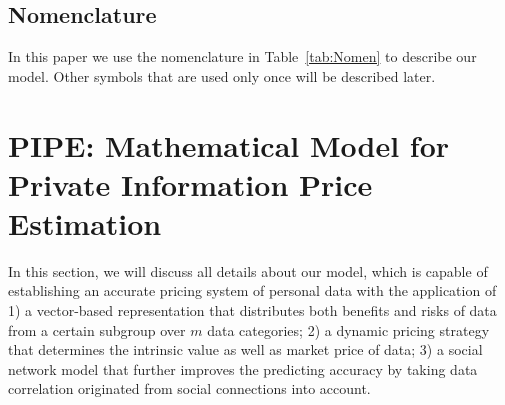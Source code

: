 \documentclass{mcmthesis}
\begin{document}
\subsection{Nomenclature}
\label{sec:nomen}

In this paper we use the nomenclature in Table~\ref{tab:Nomen} to describe our model. Other symbols that are used only once will be described later.


\section{PIPE: Mathematical Model for Private Information Price Estimation}
\label{sec:model}
In this section, we will discuss all details about our model, which is capable of establishing an accurate pricing system of personal data with the application of 1) a vector-based representation that distributes both benefits and risks of data from a certain subgroup over $m$ data categories; 2) a dynamic pricing strategy that determines the intrinsic value as well as market price of data; 3) a social network model that further improves the predicting accuracy by taking data correlation originated from social connections into account.
\end{document}
